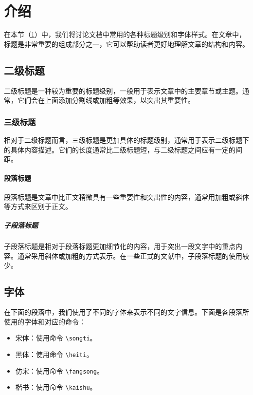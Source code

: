\section{介绍}\label{sec:introduction}

在本节（\cref{sec:introduction}）中，我们将讨论文档中常用的各种标题级别和字体样式。在文章中，标题是非常重要的组成部分之一，它可以帮助读者更好地理解文章的结构和内容。

\subsection{二级标题}

二级标题是一种较为重要的标题级别，一般用于表示文章中的主要章节或主题。通常，它们会在上面添加分割线或加粗等效果，以突出其重要性。

\subsubsection{三级标题}

相对于二级标题而言，三级标题是更加具体的标题级别，通常用于表示二级标题下的具体内容描述。它们的长度通常比二级标题短，与二级标题之间应有一定的间距。

\paragraph{段落标题}

段落标题是文章中比正文稍微具有一些重要性和突出性的内容，通常用加粗或斜体等方式来区别于正文。

\subparagraph{子段落标题}

子段落标题是相对于段落标题更加细节化的内容，用于突出一段文字中的重点内容。通常采用斜体或加粗的方式表示。在一些正式的文献中，子段落标题的使用较少。


\subsection{字体}

在下面的段落中，我们使用了不同的字体来表示不同的文字信息。下面是各段落所使用的字体和对应的命令：

\begin{itemize}
\item {\songti 宋体}：使用命令 \texttt{\textbackslash songti}。
\item {\heiti 黑体}：使用命令 \texttt{\textbackslash heiti}。
\item {\fangsong 仿宋}：使用命令 \texttt{\textbackslash fangsong}。
\item {\kaishu 楷书}：使用命令 \texttt{\textbackslash kaishu}。
\end{itemize}


